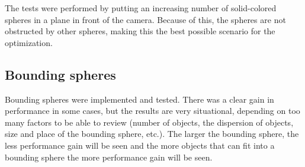 
			\begin{figure}[H]
			\end{figure}









			The tests were performed by putting an increasing number of
			solid-colored spheres in a plane in front of the camera. Because of
			this, the spheres are not obstructed by other spheres, making this
			the best possible scenario for the optimization.

		\subsection{Bounding spheres}

			Bounding spheres were implemented and tested. There was a clear
			gain in performance in some cases, but the results are very situational, 
			depending on too many factors to be able to review (number of objects, 
			the dispersion of objects, size and place of the bounding sphere, etc.). 
			The larger the bounding sphere, the less performance gain will be seen 
			and the more objects that can fit into a bounding sphere the more performance 
			gain will be seen. 

